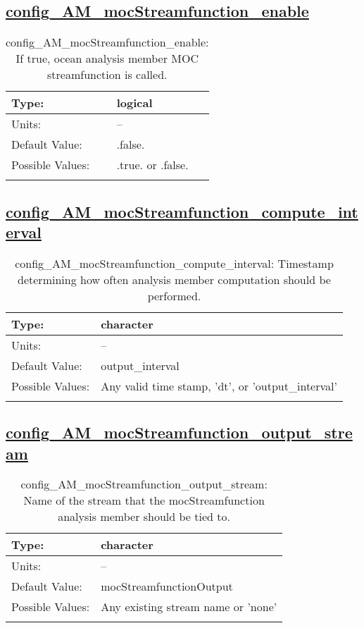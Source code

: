 \subsection[config\_AM\_mocStreamfunction\_enable]{\hyperref[sec:nm_tab_AM_mocStreamfunction]{config\_AM\_mocStreamfunction\_enable}}
\label{subsec:nm_sec_config_AM_mocStreamfunction_enable}
\begin{center}
\begin{longtable}{| p{2.0in} || p{4.0in} |}
    \hline
    Type: & logical \\
    \hline
    Units: & -- \\
    \hline
    Default Value: & .false. \\
    \hline
    Possible Values: & .true. or .false. \\
    \hline
    \caption{config\_AM\_mocStreamfunction\_enable: If true, ocean analysis member MOC streamfunction is called.}
\end{longtable}
\end{center}
\subsection[config\_AM\_mocStreamfunction\_compute\_interval]{\hyperref[sec:nm_tab_AM_mocStreamfunction]{config\_AM\_mocStreamfunction\_compute\_interval}}
\label{subsec:nm_sec_config_AM_mocStreamfunction_compute_interval}
\begin{center}
\begin{longtable}{| p{2.0in} || p{4.0in} |}
    \hline
    Type: & character \\
    \hline
    Units: & -- \\
    \hline
    Default Value: & output\_interval \\
    \hline
    Possible Values: & Any valid time stamp, 'dt', or 'output\_interval' \\
    \hline
    \caption{config\_AM\_mocStreamfunction\_compute\_interval: Timestamp determining how often analysis member computation should be performed.}
\end{longtable}
\end{center}
\subsection[config\_AM\_mocStreamfunction\_output\_stream]{\hyperref[sec:nm_tab_AM_mocStreamfunction]{config\_AM\_mocStreamfunction\_output\_stream}}
\label{subsec:nm_sec_config_AM_mocStreamfunction_output_stream}
\begin{center}
\begin{longtable}{| p{2.0in} || p{4.0in} |}
    \hline
    Type: & character \\
    \hline
    Units: & -- \\
    \hline
    Default Value: & mocStreamfunctionOutput \\
    \hline
    Possible Values: & Any existing stream name or 'none' \\
    \hline
    \caption{config\_AM\_mocStreamfunction\_output\_stream: Name of the stream that the mocStreamfunction analysis member should be tied to.}
\end{longtable}
\end{center}
